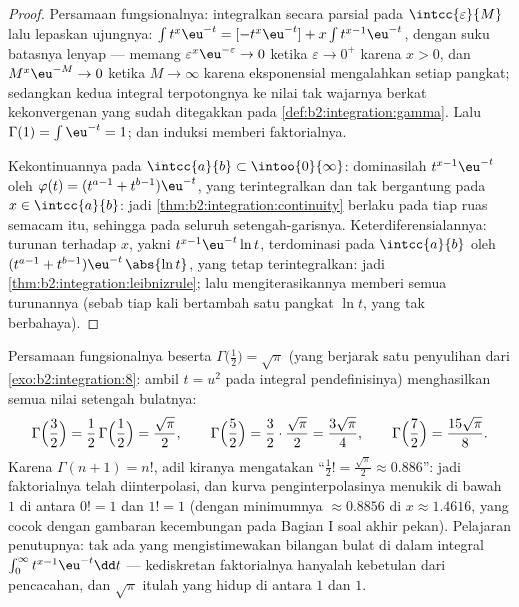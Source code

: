 \begin{proof}
Persamaan fungsionalnya: integralkan secara parsial pada
$\intcc{\varepsilon}{M}$ lalu lepaskan ujungnya: $\int t^{x}\eu^{-t} =
[-t^x\eu^{-t}] + x\int t^{x-1}\eu^{-t}$, dengan suku batasnya lenyap ---
memang $\varepsilon^x\eu^{-\varepsilon} \to 0$ ketika $\varepsilon \to
0^+$ karena $x > 0$, dan $M^x\eu^{-M} \to 0$ ketika $M \to \infty$
karena eksponensial mengalahkan setiap pangkat; sedangkan kedua integral
terpotongnya  ke nilai tak wajarnya berkat kekonvergenan yang
sudah ditegakkan pada \cref{def:b2:integration:gamma}. Lalu $\Gamma(1) =
\int \eu^{-t} = 1$; dan induksi memberi faktorialnya.

Kekontinuannya pada $\intcc{a}{b} \subset \intoo{0}{\infty}$: dominasilah
$t^{x-1}\eu^{-t}$ oleh $\varphi(t) = (t^{a-1} + t^{b-1})\eu^{-t}$, yang
terintegralkan dan tak bergantung pada $x \in \intcc{a}{b}$: jadi
\cref{thm:b2:integration:continuity} berlaku pada tiap ruas semacam itu,
sehingga pada seluruh setengah-garisnya. Keterdiferensialannya: turunan
terhadap $x$, yakni $t^{x-1}\eu^{-t}\ln t$, terdominasi pada
$\intcc{a}{b}$ oleh $(t^{a-1} + t^{b-1})\eu^{-t}\,\abs{\ln t}$, yang
tetap terintegralkan: jadi \cref{thm:b2:integration:leibnizrule};
lalu mengiterasikannya memberi semua turunannya (sebab tiap kali
bertambah satu pangkat $\ln t$, yang tak berbahaya).
\end{proof}

\begin{example}\label{ex:b2:integration:halffactorial}
Persamaan fungsionalnya beserta $\Gamma\bigl(\frac12\bigr) =
\sqrt\pi$ (yang berjarak satu penyulihan dari
\cref{exo:b2:integration:8}: ambil $t = u^2$ pada integral
pendefinisinya) menghasilkan semua nilai setengah bulatnya:
\[
\Gamma\Bigl(\frac32\Bigr) = \frac12\,\Gamma\Bigl(\frac12\Bigr)
= \frac{\sqrt\pi}{2},
\qquad
\Gamma\Bigl(\frac52\Bigr) = \frac32\cdot\frac{\sqrt\pi}{2}
= \frac{3\sqrt\pi}{4},
\qquad
\Gamma\Bigl(\frac72\Bigr) = \frac{15\sqrt\pi}{8} .
\]
Karena $\Gamma(n+1) = n!$, adil kiranya mengatakan ``$\frac12! =
\frac{\sqrt\pi}{2} \approx 0.886$'': jadi faktorialnya telah
diinterpolasi, dan kurva penginterpolasinya menukik di bawah $1$
di antara $0! = 1$ dan $1! = 1$ (dengan minimumnya $\approx 0.8856$ di
$x \approx 1.4616$, yang cocok dengan gambaran kecembungan pada
Bagian I soal akhir pekan). Pelajaran penutupnya: tak ada yang
mengistimewakan bilangan bulat di dalam integral
$\int_0^\infty t^{x-1}\eu^{-t}\dd t$ --- kediskretan faktorialnya
hanyalah kebetulan dari pencacahan, dan $\sqrt\pi$ itulah yang hidup di
antara $1$ dan $1$.
\end{example}

